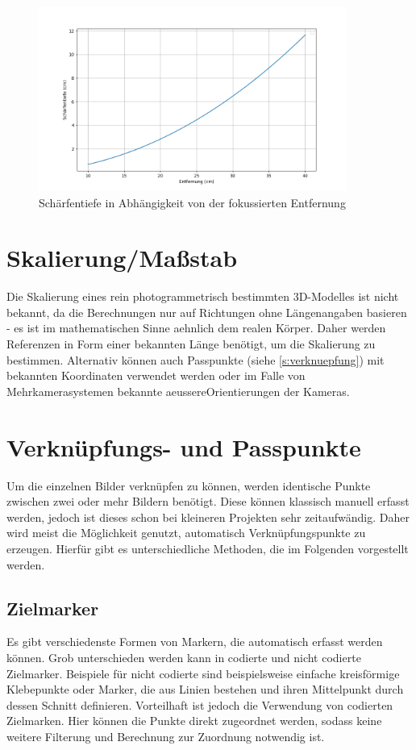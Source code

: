 \documentclass[./00PhotoBox.tex]{subfiles}
\begin{document}
\begin{figure}
    \centering
    \includegraphics[width=0.9\textwidth]{./img/2_grundlagen/schaerfentiefe_plot.png}
    \caption{Schärfentiefe in Abhängigkeit von der fokussierten Entfernung}
    \label{img:sschaerfentiefe_plot}
\end{figure}


\section{Skalierung/Maßstab}
\label{sec:massstab}
Die Skalierung eines rein photogrammetrisch bestimmten 3D-Modelles ist nicht bekannt, da die Berechnungen nur auf Richtungen ohne Längenangaben basieren - es ist im mathematischen Sinne \gls{aehnlich} dem realen Körper. Daher werden Referenzen in Form einer bekannten Länge benötigt, um die Skalierung zu bestimmen. Alternativ können auch Passpunkte (siehe \autoref{s:verknuepfung}) mit bekannten Koordinaten verwendet werden oder im Falle von Mehrkamerasystemen bekannte \gls{aeussereOrientierung}en der Kameras. \citep[S. 546]{luhmann}


\section{Verknüpfungs- und Passpunkte}
\label{s:verknuepfung}
Um die einzelnen Bilder verknüpfen zu können, werden identische Punkte zwischen zwei oder mehr Bildern benötigt. Diese können klassisch manuell erfasst werden, jedoch ist dieses schon bei kleineren Projekten sehr zeitaufwändig. Daher wird meist die Möglichkeit genutzt, automatisch Verknüpfungspunkte zu erzeugen. Hierfür gibt es unterschiedliche Methoden, die im Folgenden vorgestellt werden.


\subsection{Zielmarker}
Es gibt verschiedenste Formen von Markern, die automatisch erfasst werden können. Grob unterschieden werden kann in codierte und nicht codierte Zielmarker. Beispiele für nicht codierte sind beispielsweise einfache kreisförmige Klebepunkte oder Marker, die aus Linien bestehen und ihren Mittelpunkt durch dessen Schnitt definieren.
Vorteilhaft ist jedoch die Verwendung von codierten Zielmarken. Hier können die Punkte direkt zugeordnet werden, sodass keine weitere Filterung und Berechnung zur Zuordnung notwendig ist. \citep[S.535ff]{luhmann}
\end{document}
